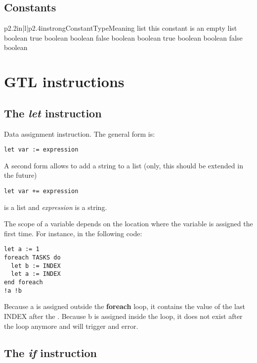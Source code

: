 \subsection{Constants}

\begin{longtableiii}{p{2.2in}|l|p{2.4in}}{strong}{Constant}{Type}{Meaning}
  {list}
  {this constant is an empty list}
  {boolean}
  {true boolean}
  {boolean}
  {false boolean}
  {boolean}
  {true boolean}
  {boolean}
  {false boolean}
\end{longtableiii}

\section{GTL instructions}

\subsection{The {\em let} instruction}

Data assignment instruction. The general form is:

\begin{lstlisting}
let var := expression
\end{lstlisting}

A second form allows to add a string to a list (only, this should be extended in the future)

\begin{lstlisting}
let var += expression
\end{lstlisting}

 is a list and {\em expression} is a string.

The scope of a variable depends on the location where the variable is assigned the first time. For instance, in the following code:

\begin{lstlisting}
let a := 1
foreach TASKS do
  let b := INDEX
  let a := INDEX
end foreach
!a !b
\end{lstlisting}

Because a is assigned outside the {\bf foreach} loop, it contains the value of the last INDEX after the . Because b is assigned inside the  loop, it does not exist after the loop anymore and  will trigger and error.


\subsection{The {\em if} instruction}


